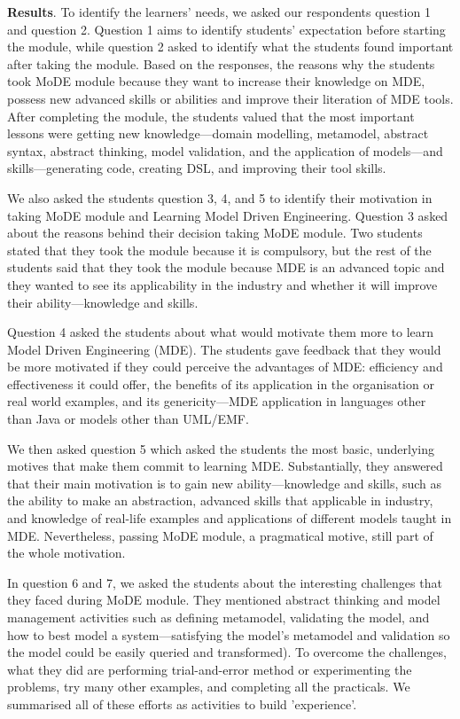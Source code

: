 \documentclass[12pt, a4paper]{report}
\begin{document}
\textbf{Results}. To identify the learners' needs, we asked our respondents question 1 and question 2. Question 1 aims to identify students' expectation before starting the module, while question 2 asked to identify what the students found important after taking the module. Based on the responses, the reasons why the students took MoDE module because they want to increase their knowledge on MDE, possess new advanced skills or abilities and improve their literation of MDE tools. After completing the module, the students valued that the most important lessons were getting new knowledge---domain modelling, metamodel, abstract syntax, abstract thinking, model validation, and the application of models---and skills---generating code, creating DSL, and improving their tool skills. 

We also asked the students question 3, 4, and 5 to identify their motivation in taking MoDE module and Learning Model Driven Engineering. Question 3 asked about the reasons behind their decision taking MoDE module. Two students stated that they took the module because it is compulsory, but the rest of the students said that they took the module because MDE is an advanced topic and they wanted to see its applicability in the industry and whether it will improve their ability---knowledge and skills. 

Question 4 asked the students about what would motivate them more to learn Model Driven Engineering (MDE). The students gave feedback that they would be more motivated if they could perceive the advantages of MDE: efficiency and effectiveness it could offer, the benefits of its application in the organisation or real world examples, and its genericity---MDE application in languages other than Java or models other than UML/EMF.

We then asked question 5 which asked the students the most basic, underlying motives that make them commit to learning MDE. Substantially, they answered that their main motivation is to gain new ability---knowledge and skills, such as the ability to make an abstraction, advanced skills that applicable in industry, and knowledge of real-life examples and applications of different models taught in MDE. Nevertheless, passing MoDE module, a pragmatical motive, still part of the whole motivation. 

In question 6 and 7, we asked the students about the interesting challenges that they faced during MoDE module. They mentioned abstract thinking and model management activities such as defining metamodel, validating the model, and how to best model a system---satisfying the model's metamodel and validation so the model could be easily queried and transformed). To overcome the challenges, what they did are performing trial-and-error method or experimenting the problems, try many other examples, and completing all the practicals. We summarised all of these efforts as activities to build 'experience'.
\end{document}
